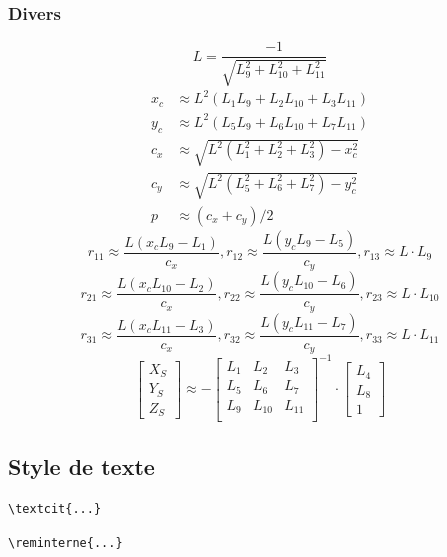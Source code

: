 \subsubsection{Divers}
\begin{equation}
    \label{eq:transdlt}
    L=\frac{-1}{\sqrt{L^2_9+L^2_{10}+L^2_{11}}}
\end{equation} 
\begin{align*}
    x_c&\approx L^2(L_1L_9+L_2L_{10}+L_3L_{11})\\
    y_c&\approx L^2(L_5L_9+L_6L_{10}+L_7L_{11})\\
    c_x&\approx\sqrt{L^2(L^2_1+L^2_2+L^2_3)-x^2_c}\\
    c_y&\approx\sqrt{L^2(L^2_5+L^2_6+L^2_7)-y^2_c}\\
    p&\approx  (c_x+c_y)/2
\end{align*}
$$r_{11}\approx\frac{L(x_cL_9-L_1)}{c_x},r_{12}\approx\frac{L(y_cL_9-L_5)}{c_y},r_{13}\approx L\cdot L_9 $$
$$r_{21}\approx\frac{L(x_cL_{10}-L_2)}{c_x},r_{22}\approx\frac{L(y_cL_{10}-L_6)}{c_y},r_{23}\approx L\cdot L_{10} $$
$$r_{31}\approx\frac{L(x_cL_{11}-L_3)}{c_x},r_{32}\approx\frac{L(y_cL_{11}-L_7)}{c_y},r_{33}\approx L\cdot L_{11} $$
\begin{equation*}
    \begin{bmatrix}
        X_S\\Y_S\\Z_S
    \end{bmatrix}\approx -
    \begin{bmatrix}
        L_1&L_2&L_3\\
        L_5&L_6&L_7\\
        L_9&L_{10}&L_{11}\\
    \end{bmatrix}^{-1}\cdot 
    \begin{bmatrix}
        L_4\\L_8\\1
    \end{bmatrix}
\end{equation*}

\subsection{Style de texte}

\verb|\textcit{...}|


\verb|\reminterne{...}|


